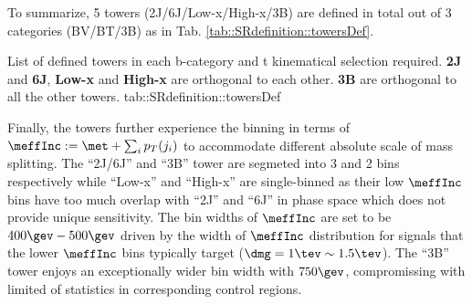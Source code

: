 To summarize, 5 towers (2J/6J/Low-x/High-x/3B) are defined in total out of 3 categories (BV/BT/3B) as in Tab. \ref{tab::SRdefinition::towersDef}. 


{List of defined towers in each b-category and t kinematical selection required. \textbf{2J} and \textbf{6J}, \textbf{Low-x} and \textbf{High-x} are orthogonal to each other. \textbf{3B} are orthogonal to all the other towers.}
{tab::SRdefinition::towersDef}


\clearpage
Finally, the towers further experience the binning in terms of $\meffInc := \met + \sum_{i} p_T (j_i)$ to accommodate different absolute scale of mass splitting. 
The ``2J/6J'' and ``3B'' tower are segmeted into 3 and 2 bins respectively while ``Low-x'' and ``High-x'' are single-binned as their low $\meffInc$ bins have too much overlap with ``2J'' and ``6J'' in phase space which does not provide unique sensitivity. The bin widths of $\meffInc$ are set to be $400\gev-500\gev$ driven by the width of $\meffInc$ distribution for signals that the lower $\meffInc$ bins typically target ($\dmg = 1\tev \sim 1.5\tev$). The ``3B'' tower enjoys an exceptionally wider bin width with $750\gev$, compromissing with limited of statistics in corresponding control regions. \\

